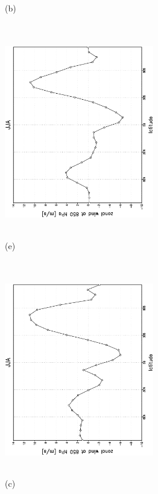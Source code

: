 \documentclass[12pt,a4paper,twoside,openright,headinclude,liststotoc,bibtotoc]{scrreprt}
\begin{document}
\begin{appendix}
\begin{figure}[b]
{}
\parbox{8.5cm}{\hspace{0.80cm} \begin{scriptsize}(b) \end{scriptsize} \vspace{-0.5cm} \\
\includegraphics[height=8.5cm,width=6.5cm,angle=-90]
{eps/zonysmu_850JJA.eps}
}
\parbox{8.5cm}{\hspace{0.80cm} \begin{scriptsize}(e) \end{scriptsize} \vspace{-0.5cm} \\
\includegraphics[height=8.5cm,width=6.5cm,angle=-90]
{eps/t21zonysmuvel131JJA850.eps}
}
\parbox{8.5cm}{\hspace{0.80cm} \begin{scriptsize}(c) \end{scriptsize} \vspace{-0.5cm} \\
}
\end{figure}
\end{appendix}
\end{document}
